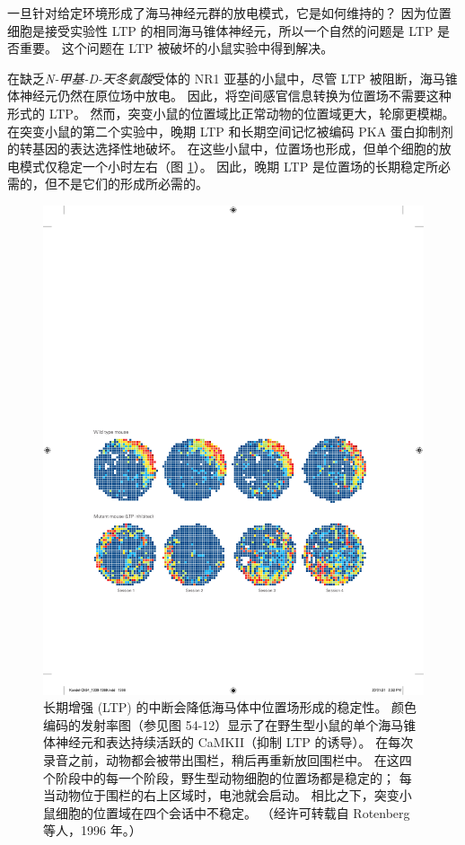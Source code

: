 一旦针对给定环境形成了海马神经元群的放电模式，它是如何维持的？
因为位置细胞是接受实验性 LTP 的相同海马锥体神经元，所以一个自然的问题是 LTP 是否重要。
这个问题在 LTP 被破坏的小鼠实验中得到解决。


在缺乏\textit{N-甲基-D-天冬氨酸}受体的 NR1 亚基的小鼠中，尽管 LTP 被阻断，海马锥体神经元仍然在原位场中放电。
因此，将空间感官信息转换为位置场不需要这种形式的 LTP。
然而，突变小鼠的位置域比正常动物的位置域更大，轮廓更模糊。
在突变小鼠的第二个实验中，晚期 LTP 和长期空间记忆被编码 PKA 蛋白抑制剂的转基因的表达选择性地破坏。 在这些小鼠中，位置场也形成，但单个细胞的放电模式仅稳定一个小时左右（图 \ref{fig:54_16}）。
因此，晚期 LTP 是位置场的长期稳定所必需的，但不是它们的形成所必需的。


\begin{figure}[htbp]
	\centering
	\includegraphics[width=0.9\linewidth]{chap54/fig_54_16}
	\caption{长期增强 (LTP) 的中断会降低海马体中位置场形成的稳定性。 颜色编码的发射率图（参见图 54-12）显示了在野生型小鼠的单个海马锥体神经元和表达持续活跃的 CaMKII（抑制 LTP 的诱导）。 在每次录音之前，动物都会被带出围栏，稍后再重新放回围栏中。 在这四个阶段中的每一个阶段，野生型动物细胞的位置场都是稳定的； 每当动物位于围栏的右上区域时，电池就会启动。 相比之下，突变小鼠细胞的位置域在四个会话中不稳定。 （经许可转载自 Rotenberg 等人，1996 年。）}
	\label{fig:54_16}
\end{figure}


